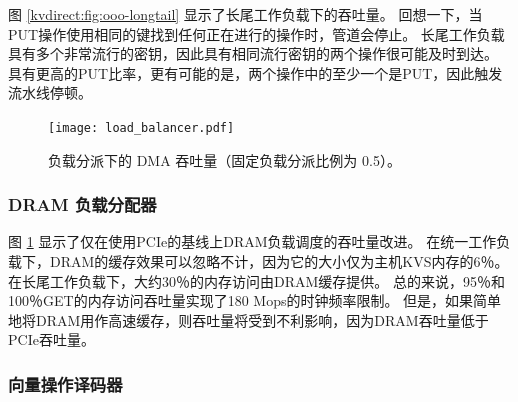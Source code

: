 图 \ref {kvdirect:fig:ooo-longtail} 显示了长尾工作负载下的吞吐量。
回想一下，当PUT操作使用相同的键找到任何正在进行的操作时，管道会停止。
长尾工作负载具有多个非常流行的密钥，因此具有相同流行密钥的两个操作很可能及时到达。
具有更高的PUT比率，更有可能的是，两个操作中的至少一个是PUT，因此触发流水线停顿。


\begin{figure}[t]
\centering
{\texttt{[image: load\_balancer.pdf]}}
\caption{负载分派下的 DMA 吞吐量（固定负载分派比例为 0.5）。}
\label{kvdirect:fig:cache-tput}

\end{figure}

\subsubsection{DRAM 负载分配器}
\label{kvdirect:sec:dram-eval}

图 \ref {kvdirect:fig:cache-tput} 显示了仅在使用PCIe的基线上DRAM负载调度的吞吐量改进。
在统一工作负载下，DRAM的缓存效果可以忽略不计，因为它的大小仅为主机KVS内存的6％。
在长尾工作负载下，大约30％的内存访问由DRAM缓存提供。 总的来说，95％和100％GET的内存访问吞吐量实现了180 Mops的时钟频率限制。
但是，如果简单地将DRAM用作高速缓存，则吞吐量将受到不利影响，因为DRAM吞吐量低于PCIe吞吐量。

\subsubsection{向量操作译码器}
\label{kvdirect:network-eval}

\begin{table}[]
\centering
{}
\caption{向量操作的吞吐量 (GB/s)。}
\label{kvdirect:tab:vec_throughput}

\end{table}

